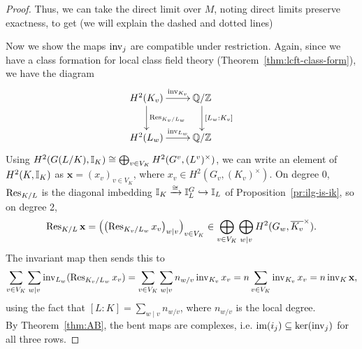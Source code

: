 \begin{proof}
Thus, we can take the direct limit over $M$, noting direct limits preserve exactness, to get (we will explain the dashed and dotted lines)
\eeq

Now we show the maps $\operatorname{inv}_j$ are compatible under restriction. Again, since we have a class formation for local class field theory (Theorem~\ref{thm:lcft-class-form}), we have the diagram
\[
\xymatrix{
H^2(K_v)\ar[r]^-{\inv_{K_v}}\ar[d]^{\Res_{K_v/L_w}} & \Q/\Z\ar[d]^{[L_w:K_v]} \\
H^2(L_w)\ar[r]^-{\inv_{L_w}} & \Q/\Z
}
\]
Using $H^2(G(L/K),\mathbb{I}_K)\cong \bigoplus_{v\in V_K} H^2(G^v,(L^v)^{\times})$, we can write an element of $H^2(K,\mathbb{I}_K)$ as $\mathbf x=(x_v)_{v\in V_K}$, where $x_v\in H^2(G_v,(K_v)^{\times})$. On degree 0, $\operatorname{Res}_{K/L}$ is the diagonal imbedding $\mathbb{I}_K\xrightarrow{\cong} \mathbb{I}_L^G\hookrightarrow \mathbb{I}_L$ of Proposition~\ref{pr:ilg-is-ik}, so on degree 2,
\[
\operatorname{Res}_{K/L}\mathbf x=\left( {\left( {\operatorname{Res}_{K_v/L_w}x_v} \right)_{w\mid v}} \right)_{v\in V_K}\in \bigoplus_{v\in V_K}
\bigoplus_{w\mid v} H^2(G_w,\overline{K_v}^{\times}).
\]
The invariant map then sends this to
\[
\sum_{v\in V_K} \sum_{w\mid v} \operatorname{inv}_{L_w}(\operatorname{Res}_{K_v/L_w}x_v) = 
\sum_{v\in V_K}\sum_{w\mid v} n_{w/v} \operatorname{inv}_{K_v} x_v
=n\sum_{v\in V_K} \operatorname{inv}_{K_v}x_v=n\operatorname{inv}_K\mathbf x,
\]
using the fact that $[L:K]=\sum_{w\mid v}n_{w/v}$, where $n_{w/v}$ is the local degree.\\

By Theorem~\ref{thm:AB}, the bent maps are complexes, i.e. $\text{im}(i_j)\subseteq \ker(\operatorname{inv}_j)$ for all three rows. %


\end{proof}
